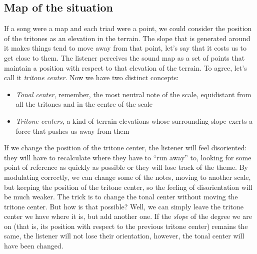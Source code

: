 \documentclass[]{report}
\providecommand{\tightlist}{%
  \setlength{\itemsep}{0pt}
  \setlength{\parskip}{0pt}
}
\begin{document}
\subsection{Map of the situation}
If a song were a map and each triad were a point, we could consider the position of the tritones as an elevation in the terrain. The slope that is generated around it makes things tend to move away from that point, let's say that it costs us to get close to them.
The listener perceives the sound map as a set of points that maintain a position with respect to that elevation of the terrain. To agree, let's call it \emph{tritone center}.
Now we have two distinct concepts:
\begin{itemize} \tightlist
\item \emph{Tonal center}, remember, the most neutral note of the scale, equidistant from all the tritones and in the centre of the scale
\item \emph{Tritone centers}, a kind of terrain elevations whose surrounding slope exerts a force that pushes us away from them
\end{itemize}
If we change the position of the tritone center, the listener will feel disoriented: they will have to recalculate where they have to ``run away'' to, looking for some point of reference as quickly as possible or they will lose track of the theme.
By modulating correctly, we can change some of the notes, moving to another scale, but keeping the position of the tritone center, so the feeling of disorientation will be much weaker.
The trick is to change the tonal center without moving the tritone center. But how is that possible? Well, we can simply leave the tritone center we have where it is, but add another one. If the \emph{slope} of the degree we are on (that is, its position with respect to the previous tritone center) remains the same, the listener will not lose their orientation, however, the tonal center will have been changed.
\end{document}
